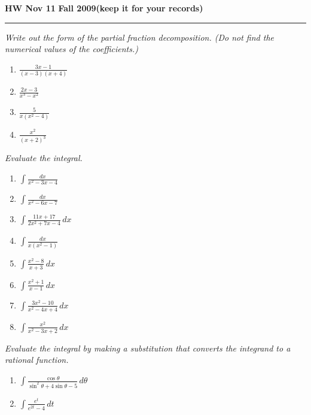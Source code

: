\documentclass[12pt]{amsart}
\begin{document}
\hfill{\large\bf HW Nov 11}\hfill{\large\bf
  Fall 2009}\hfill{\large\bf (keep it for your records)}\hrule

\bigskip
{\problem \em Write out the form of the partial fraction
  decomposition.  (Do not find the numerical values of the
  coefficients.)}
\begin{enumerate}
\item $\displaystyle{\frac{3x-1}{(x-3)(x+4)}}$\vspace{0.25cm}
\item $\displaystyle{\frac{2x-3}{x^3-x^2}}$\vspace{0.25cm}
\item $\displaystyle{\frac{5}{x(x^2-4)}}$\vspace{0.25cm}
\item $\displaystyle{\frac{x^2}{(x+2)^3}}$
\end{enumerate}
{\problem \em Evaluate the integral.}
\begin{enumerate}
\item $\displaystyle{\int \frac{dx}{x^2-3x-4}}$\vspace{0.25cm}
\item $\displaystyle{\int \frac{dx}{x^2-6x-7}}$\vspace{0.25cm}
\item $\displaystyle{\int \frac{11x+17}{2x^2+7x-4}\, dx}$\vspace{0.25cm}
\item $\displaystyle{\int \frac{dx}{x(x^2-1)}}$\vspace{0.25cm}
\item $\displaystyle{\int \frac{x^2-8}{x+3}\, dx}$\vspace{0.25cm}
\item $\displaystyle{\int \frac{x^2+1}{x-1}\, dx}$\vspace{0.25cm}
\item $\displaystyle{\int \frac{3x^2-10}{x^2-4x+4}\, dx}$\vspace{0.25cm}
\item $\displaystyle{\int \frac{x^2}{x^2-3x+2}\, dx}$
\end{enumerate}
{\problem \em Evaluate the integral by making a substitution that
  converts the integrand to a rational function.}
\begin{enumerate}
\item $\displaystyle{\int \frac{\cos \theta}{\sin^2\theta +4 \sin
      \theta -5}\, d\theta}$\vspace{0.25cm}
\item $\displaystyle{\int \frac{e^t}{e^{2t}-4}\, dt}$
\end{enumerate}
\end{document}
